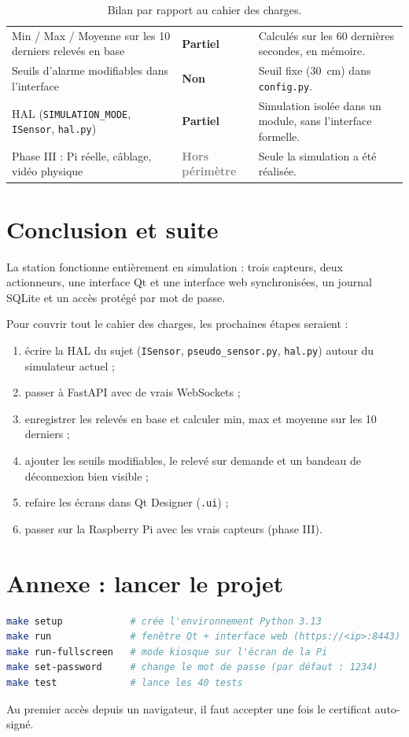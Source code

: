 \documentclass[11pt,a4paper]{article}
\newcommand{\partiel}{\textcolor{partiel}{\textbf{Partiel}}}
\newcommand{\non}{\textcolor{non}{\textbf{Non}}}
\newcommand{\hors}{\textcolor{gray}{\textbf{Hors périmètre}}}
\begin{document}
\begin{table}[H]
\begin{tabularx}{\linewidth}{>{\raggedright}p{5.2cm} l >{\raggedright\arraybackslash}X}
Min / Max / Moyenne sur les 10 derniers relevés en base & \partiel & Calculés sur les 60 dernières secondes, en mémoire. \\
Seuils d'alarme modifiables dans l'interface & \non & Seuil fixe (30~cm) dans \texttt{config.py}. \\
HAL (\texttt{SIMULATION\_MODE}, \texttt{ISensor}, \texttt{hal.py}) & \partiel & Simulation isolée dans un module, sans l'interface formelle. \\
Phase III : Pi réelle, câblage, vidéo physique & \hors & Seule la simulation a été réalisée. \\
\bottomrule
\end{tabularx}
\caption{Bilan par rapport au cahier des charges.}
\end{table}

\section{Conclusion et suite}
La station fonctionne entièrement en simulation : trois capteurs, deux actionneurs, une interface Qt et une
interface web synchronisées, un journal SQLite et un accès protégé par mot de passe.

Pour couvrir tout le cahier des charges, les prochaines étapes seraient :
\begin{enumerate}
  \item écrire la HAL du sujet (\texttt{ISensor}, \texttt{pseudo\_sensor.py}, \texttt{hal.py}) autour du simulateur actuel ;
  \item passer à FastAPI avec de vrais WebSockets ;
  \item enregistrer les relevés en base et calculer min, max et moyenne sur les 10 derniers ;
  \item ajouter les seuils modifiables, le relevé sur demande et un bandeau de déconnexion bien visible ;
  \item refaire les écrans dans Qt Designer (\texttt{.ui}) ;
  \item passer sur la Raspberry Pi avec les vrais capteurs (phase III).
\end{enumerate}

\appendix
\section{Annexe : lancer le projet}
\begin{lstlisting}[language=bash,numbers=none]
make setup            # crée l'environnement Python 3.13
make run              # fenêtre Qt + interface web (https://<ip>:8443)
make run-fullscreen   # mode kiosque sur l'écran de la Pi
make set-password     # change le mot de passe (par défaut : 1234)
make test             # lance les 40 tests
\end{lstlisting}
Au premier accès depuis un navigateur, il faut accepter une fois le certificat auto-signé.
\end{document}
